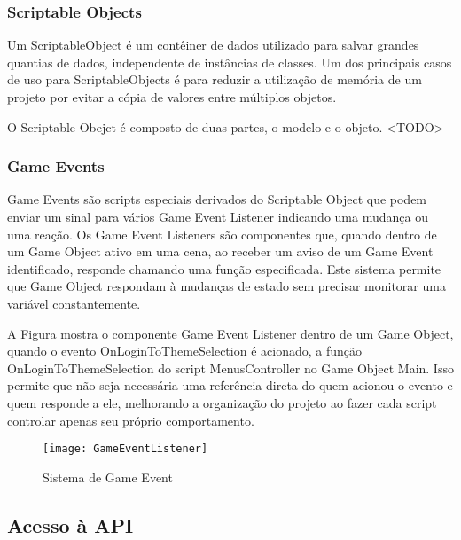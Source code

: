 \subsubsection{Scriptable Objects}
\label{subsubsec:scriptableobjects}

Um ScriptableObject é um contêiner de dados utilizado para salvar grandes quantias de dados, independente de instâncias de classes. Um dos principais casos de uso para ScriptableObjects é para reduzir a utilização de memória de um projeto por evitar a cópia de valores entre múltiplos objetos.\cite{scriptableobject}

O Scriptable Obejct é composto de duas partes, o modelo e o objeto. <TODO>

\subsubsection{Game Events}
\label{subsubsec:gameevents}

Game Events são scripts especiais derivados do Scriptable Object que podem enviar um sinal para vários Game Event Listener indicando uma mudança ou uma reação. Os Game Event Listeners são componentes que, quando dentro de um Game Object ativo em uma cena, ao receber um aviso de um Game Event identificado, responde chamando uma função especificada. Este sistema permite que Game Object respondam à mudanças de estado sem precisar monitorar uma variável constantemente.\cite{scriptableobjectarchitecture}

A Figura  mostra o componente Game Event Listener dentro de um Game Object, quando o evento OnLoginToThemeSelection é acionado, a função OnLoginToThemeSelection do script MenusController no Game Object Main. Isso permite que não seja necessária uma referência direta do quem acionou o evento e quem responde a ele, melhorando a organização do projeto ao fazer cada script controlar apenas seu próprio comportamento.

\begin{figure}[htb]
\caption{\label{fig:estrutura} Sistema de Game Event }
\begin{center}
\texttt{[image: GameEventListener]}
\end{center}
\end{figure}

\subsection{Acesso à API}
\label{subsec:acessoapi}

